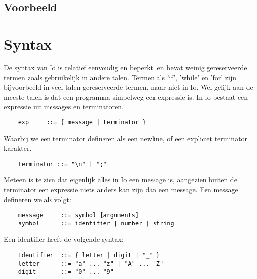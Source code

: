 \documentclass[12pt]{article}
\begin{document}
\subsection*{Voorbeeld}


\section{Syntax}

De syntax van Io is relatief eenvoudig en beperkt, en bevat weinig gereserveerde termen zoals gebruikelijk in andere talen. Termen als 'if', 'while' en 'for' zijn bijvoorbeeld in veel talen gereserveerde termen, maar niet in Io. Wel gelijk aan de meeste talen is dat een programma simpelweg een expressie is. In Io bestaat een expressie uit messages en terminatoren.

\begin{lstlisting}
	exp		::= { message | terminator }
\end{lstlisting}
Waarbij we een terminator defineren als een newline, of een expliciet terminator karakter.
\begin{lstlisting}
	terminator ::= "\n" | ";"
\end{lstlisting}
Meteen is te zien dat eigenlijk alles in Io een message is, aangezien buiten de terminator een expressie niets anders kan zijn dan een message. Een message defineren we als volgt:
\begin{lstlisting}
	message		::= symbol [arguments]
	symbol		::= identifier | number | string
\end{lstlisting}

Een identifier heeft de volgende syntax:
\begin{lstlisting}
	Identifier 	::= { letter | digit | "_" }
	letter 		::= "a" ... "z" | "A" ... "Z"
	digit 		::= "0" ... "9"
\end{lstlisting}
\end{document}
